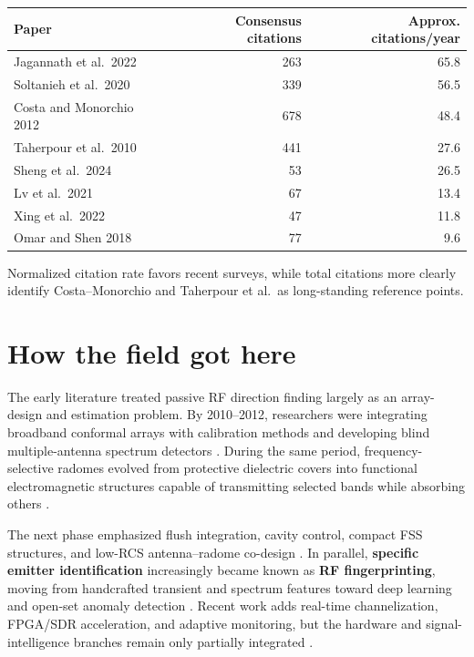\documentclass[
  10pt,
]{article}
\begin{document}
\begin{longtable}[]{@{}lrr@{}}
\toprule\noalign{}
Paper & Consensus citations & Approx. citations/year \\
\midrule\noalign{}
\endhead
\bottomrule\noalign{}
\endlastfoot
Jagannath et al.~2022 \citep{jagannath2022} & 263 & 65.8 \\
Soltanieh et al.~2020 \citep{soltanieh2020} & 339 & 56.5 \\
Costa and Monorchio 2012 \citep{costa2012} & 678 & 48.4 \\
Taherpour et al.~2010 \citep{taherpour2010} & 441 & 27.6 \\
Sheng et al.~2024 \citep{sheng2024} & 53 & 26.5 \\
Lv et al.~2021 \citep{lv2021} & 67 & 13.4 \\
Xing et al.~2022 \citep{xing2022} & 47 & 11.8 \\
Omar and Shen 2018 \citep{omar2018} & 77 & 9.6 \\
\end{longtable}

Normalized citation rate favors recent surveys, while total citations
more clearly identify Costa--Monorchio and Taherpour et al.~as
long-standing reference points.

\section{How the field got here}\label{how-the-field-got-here}

The early literature treated passive RF direction finding largely as an
array-design and estimation problem. By 2010--2012, researchers were
integrating broadband conformal arrays with calibration methods and
developing blind multiple-antenna spectrum detectors
\citep{caratelli2011, liberal2011, taherpour2010}. During the same
period, frequency-selective radomes evolved from protective dielectric
covers into functional electromagnetic structures capable of
transmitting selected bands while absorbing others \citep{costa2012}.

The next phase emphasized flush integration, cavity control, compact FSS
structures, and low-RCS antenna--radome co-design
\citep{lv2021, omar2018, tianang2017, xing2022}. In parallel,
\textbf{specific emitter identification} increasingly became known as
\textbf{RF fingerprinting}, moving from handcrafted transient and
spectrum features toward deep learning and open-set anomaly detection
\citep{jagannath2022, soltanieh2020, zhang2025open}. Recent work adds
real-time channelization, FPGA/SDR acceleration, and adaptive
monitoring, but the hardware and signal-intelligence branches remain
only partially integrated
\citep{flak2022, gharat2026, madanayake2024, sorecau2026}.
\end{document}
